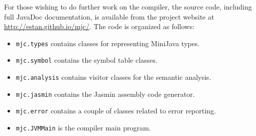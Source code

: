 \documentclass[a4paper,11pt]{article}
\begin{document}
For those wishing to do further work on the compiler, the source code, including full
JavaDoc documentation, is available from
the project website at \url{http://estan.github.io/mjc/}. The code is organized as
follows:

\begin{itemize}
    \item \texttt{mjc.types} contains classes for representing MiniJava types.
    \item \texttt{mjc.symbol} contains the symbol table classes.
    \item \texttt{mjc.analysis} contains visitor classes for the semantic analysis.
    \item \texttt{mjc.jasmin} contains the Jasmin assembly code generator.
    \item \texttt{mjc.error} contains a couple of classes related to error reporting.
    \item \texttt{mjc.JVMMain} is the compiler main program.
\end{itemize}

\printbibliography[heading=bibintoc]
\end{document}
